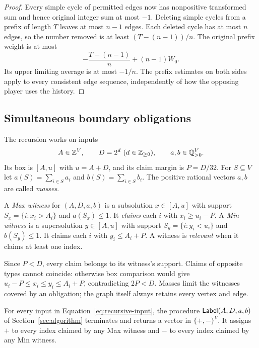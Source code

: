 \begin{proof}
Every simple cycle of permitted edges now has nonpositive
transformed sum and hence original integer sum at most $-1$.
Deleting simple cycles from a prefix of length $T$ leaves at most
$n-1$ edges. Each deleted cycle has at most $n$ edges, so the
number removed is at least $(T-(n-1))/n$. The original prefix
weight is at most
\[
                       -\frac{T-(n-1)}n+(n-1)W_0.
\]
Its upper limiting average is at most $-1/n$. The prefix estimates
on both sides apply to every consistent edge sequence, independently
of how the opposing player uses the history.
\end{proof}

\subsection{Simultaneous boundary obligations}

The recursion works on inputs
\begin{equation}
 A\in\mathbb Z^V,\qquad D=2^d\ (d\in\mathbb Z_{\ge0}),\qquad
 a,b\in\mathbb Q_{>0}^V.
 \label{eq:recursive-input}
\end{equation}
Its box is $[A,u]$ with $u=A+D$, and its claim margin is
$P=D/32$. For $S\subseteq V$ let
$a(S)=\sum_{i\in S}a_i$ and $b(S)=\sum_{i\in S}b_i$.
The positive rational vectors $a,b$ are called \emph{masses}.

\begin{definition}
\label{def:witnesses}
A \emph{Max witness} for $(A,D,a,b)$ is a subsolution
$x\in[A,u]$ with support $S_x=\{i:x_i>A_i\}$ and
$a(S_x)\le1$. It \emph{claims} each $i$ with $x_i\ge u_i-P$.
A \emph{Min witness} is a supersolution $y\in[A,u]$ with support
$S_y=\{i:y_i<u_i\}$ and $b(S_y)\le1$. It claims each $i$
with $y_i\le A_i+P$. A witness is \emph{relevant} when it claims
at least one index.
\end{definition}

Since $P<D$, every claim belongs to its witness's support. Claims
of opposite types cannot coincide: otherwise box comparison would
give $u_i-P\le x_i\le y_i\le A_i+P$, contradicting $2P<D$.
Masses limit the witnesses covered by an obligation; the graph itself
always retains every vertex and edge.

\begin{theorem}
\label{thm:labelling}
For every input in Equation~\eqref{eq:recursive-input}, the
procedure $\mathsf{Label}(A,D,a,b)$ of Section~\ref{sec:algorithm}
terminates and returns a vector in $\{+,-\}^V$. It assigns $+$
to every index claimed by any Max witness and $-$ to every index
claimed by any Min witness.
\end{theorem}

